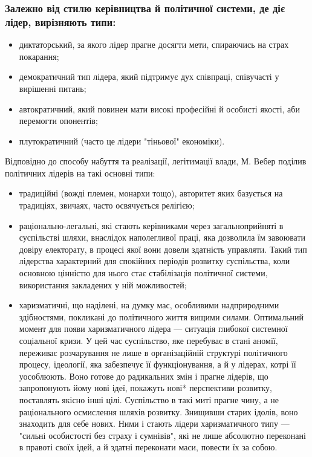 \subsubsection{Залежно від стилю керівництва й політичної системи, де діє лідер, вирізняють типи:}
\begin{itemize}
\item диктаторський, за якого лідер прагне досягти мети, спираючись на страх покарання;
\item демократичний тип лідера, який підтримує дух співпраці, співучасті у вирішенні питань;
\item автократичний, який повинен мати високі професійні й особисті якості, аби перемогти опонентів;
\item плутократичний (часто це лідери "тіньової" економіки).
\end{itemize}
Відповідно до способу набуття та реалізації, легітимації влади, М. Вебер поділив політичних лідерів на такі основні типи:
\begin{itemize}
\item традиційні (вожді племен, монархи тощо), авторитет яких базується на традиціях, звичаях, часто освячується релігією;
\item  раціонально-легальні, які стають керівниками через загальноприйняті в суспільстві шляхи, внаслідок наполегливої праці, яка дозволила їм завоювати довіру електорату, в процесі якої вони довели здатність управляти. Такий тип лідерства характерний для спокійних періодів розвитку суспільства, коли основною цінністю для нього стає стабілізація політичної системи, використання закладених у ній можливостей;
\item харизматичні, що наділені, на думку мас, особливими надприродними здібностями, покликані до політичного життя вищими силами. Оптимальний момент для появи харизматичного лідера — ситуація глибокої системної соціальної кризи. У цей час суспільство, яке перебуває в стані аномії, переживає розчарування не лише в організаційній структурі політичного процесу, ідеології, яка забезпечує її функціонування, а й у лідерах, котрі її уособлюють. Воно готове до радикальних змін і прагне лідерів, що запропонують йому нові ідеї, покажуть нові* перспективи розвитку, поставлять якісно інші цілі. Суспільство в такі миті прагне чину, а не раціонального осмислення шляхів розвитку. Знищивши старих ідолів, воно знаходить для себе нових. Ними і стають лідери харизматичного типу — "сильні особистості без страху і сумнівів", які не лише абсолютно переконані в правоті своїх ідей, а й здатні переконати маси, повести їх за собою.
\end{itemize}

